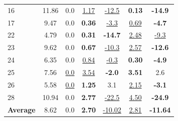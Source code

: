 \begin{table}[htbp]
{\begin{tabular}{lcccccc}
            16 & 11.86 & 0.0 & \underline{1.17} & \underline{-12.5} & \textbf{0.13} & \textbf{-14.9} \\
            17 & 9.47 & 0.0 & \textbf{0.36} & \underline{-3.3} & \underline{0.69} & \textbf{-4.7} \\
            22 & 4.79 & 0.0 & \textbf{0.31} & \textbf{-14.7} & \underline{2.48} & \underline{-9.3} \\
            23 & 9.62 & 0.0 & \textbf{0.67} & \underline{-10.3} & \underline{2.57} & \textbf{-12.6} \\
            24 & 6.35 & 0.0 & \underline{0.84} & \underline{-0.3} & \textbf{0.30} & \textbf{-4.9} \\
            25 & 7.56 & \underline{0.0} & \underline{3.54} & \textbf{-2.0} & \textbf{3.51} & 2.6 \\
            26 & 5.58 & \underline{0.0} & \textbf{1.25} & 3.1 & \underline{2.15} & \textbf{-3.1} \\
            28 & 10.94 & 0.0 & \textbf{2.77} & \underline{-22.5} & \underline{4.50} & \textbf{-24.9} \\
            \midrule
            \textbf{Average} & 8.62 & 0.0 & \textbf{2.70} & \underline{-10.02} & \underline{2.81} & \textbf{-11.64} \\
            \bottomrule
        \end{tabular}%
    }
\end{table}

\begin{table}[htbp]
    \centering
    \caption{Rate Control Performance on the HEVC Class B Dataset. (Note: \textbf{Lower} BRE is better; \textbf{more negative} BD-Rate is better.)}
    \label{tab:hevc_b_performance}
\end{table}

